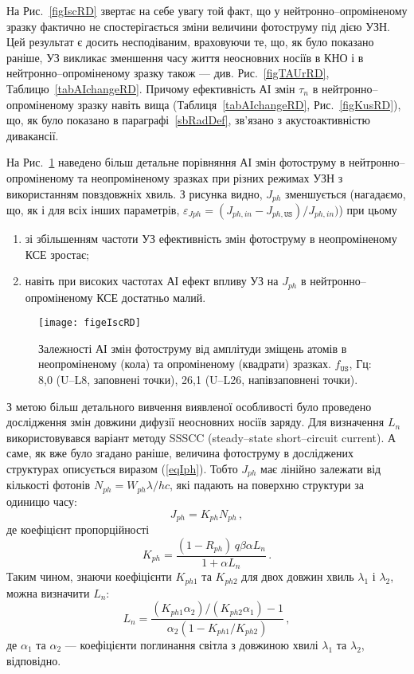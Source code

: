 На Рис.~\ref{figIscRD} звертає на себе увагу той факт, що у нейтронно--опроміненому
зразку фактично не спостерігається зміни величини фотоструму під дією УЗН.
Цей результат є досить несподіваним, враховуючи те, що, як було показано раніше,
УЗ викликає зменшення часу життя неосновних носіїв в КНО і в нейтронно--опроміненому зразку також ---
див. Рис.~\ref{figTAUrRD}, Таблицю~\ref{tabAIchangeRD}.
Причому ефективність АІ змін $\tau_n$ в нейтронно--опроміненому зразку навіть вища (Таблиця~\ref{tabAIchangeRD}, Рис.~\ref{figKusRD}),
що, як було показано в параграфі~\ref{sbRadDef}, зв'язано з акустоактивністю дивакансії.

На Рис.~\ref{figeIscRD} наведено більш детальне порівняння АІ змін фотоструму в нейтронно--опроміненому та неопроміненому
зразках при різних режимах УЗН з використанням повздовжніх хвиль.
З рисунка видно, $J_{ph}$ зменшується (нагадаємо, що, як і для всіх інших параметрів, $\varepsilon_{Jph}=(J_{ph,in}-J_{ph,\mathtt{US}})/{J_{ph,in}})$) при цьому
\begin{enumerate}[label=\asbuk*),leftmargin=0em,itemindent=1.5em]
\item зі збільшенням частоти УЗ ефективність змін фотоструму в неопроміненому КСЕ зростає;
\item навіть при високих частотах АІ ефект впливу УЗ на $J_{ph}$ в нейтронно--опроміненому КСЕ достатньо малий.
\end{enumerate}


\begin{figure}
\center
\texttt{[image: figeIscRD]}
\caption{\label{figeIscRD}
Залежності АІ змін фотоструму від
амплітуди зміщень атомів в неопроміненому (кола)
та опроміненому (квадрати) зразках.
$f_\mathtt{US}$, Гц: 8,0 (U--L8, заповнені точки),
26,1 (U--L26, напівзаповнені точки).
}%
\end{figure}

З метою більш детального вивчення виявленої особливості було проведено дослідження змін
довжини дифузії неосновних носіїв заряду.
Для визначення $L_n$ використовувався варіант методу SSSCC (steady--state short--circuit current)\cite{Schroder2006}.
А саме, як вже було згадано раніше, величина фотоструму в досліджених структурах
описується виразом (\ref{eqIph}).
Тобто $J_{ph}$ має лінійно залежати від кількості фотонів
\mbox{$N_{ph}=W_{ph}\lambda /hc$}, які падають на поверхню структури за одиницю часу:
\begin{equation}
J_{ph}=K_{ph}N_{ph}\,,
\end{equation}
де коефіцієнт пропорційності
\begin{equation}
 K_{ph}=\frac{(1-R_{ph})\,q\beta \alpha L_n} {1+\alpha L_n}\,.
\end{equation}
Таким чином, знаючи коефіцієнти $K_{ph1}$ та $K_{ph2}$
для двох довжин хвиль $\lambda_1$ і $\lambda_2$, можна
визначити $L_n$:
\begin{equation}\label{F3}
L_n=\frac{(K_{ph1}\alpha_2)/(K_{ph2}\alpha_1)-1}{\alpha_2(1-K_{ph1}/K_{ph2})}\,,
\end{equation}
де $\alpha_1$ та $\alpha_2$ --- коефіцієнти поглинання світла з довжиною хвилі $\lambda_1$ та $\lambda_2$, відповідно.

